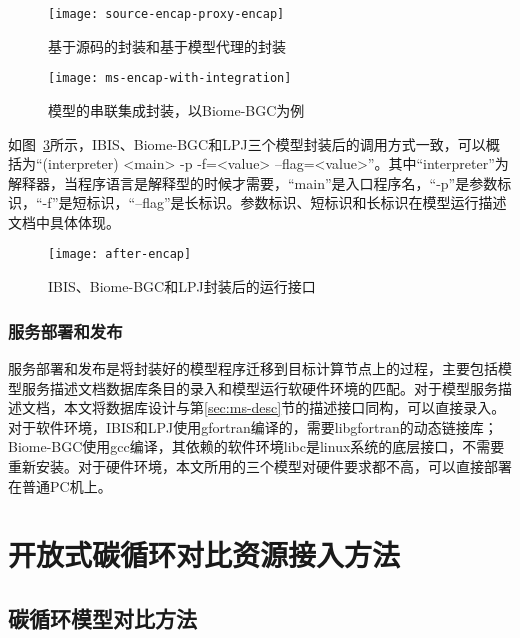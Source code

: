 \begin{figure}[!htbp]
    \centering
    \texttt{[image: source-encap-proxy-encap]}
    \caption{基于源码的封装和基于模型代理的封装}
    \label{fig:source-encap-proxy-encap}
\end{figure}

\begin{figure}[!htbp]
    \centering
    \texttt{[image: ms-encap-with-integration]}
    \caption{模型的串联集成封装，以Biome-BGC为例}
    \label{fig:ms-encap-with-integration}
\end{figure}

如图~\ref{fig:after-encap}所示，IBIS、Biome-BGC和LPJ三个模型封装后的调用方式一致，可以概括为``(interpreter) <main> -p -f=<value> --flag=<value>''。其中``interpreter''为解释器，当程序语言是解释型的时候才需要，“main”是入口程序名，“-p”是参数标识，“-f”是短标识，“--flag”是长标识。参数标识、短标识和长标识在模型运行描述文档中具体体现。

\begin{figure}[!htbp]
    \centering
    \texttt{[image: after-encap]}
    \caption{IBIS、Biome-BGC和LPJ封装后的运行接口}
    \label{fig:after-encap}
\end{figure}


\subsubsection{服务部署和发布}
服务部署和发布是将封装好的模型程序迁移到目标计算节点上的过程，主要包括模型服务描述文档数据库条目的录入和模型运行软硬件环境的匹配。对于模型服务描述文档，本文将数据库设计与第\ref{sec:ms-desc}节的描述接口同构，可以直接录入。对于软件环境，IBIS和LPJ使用gfortran编译的，需要libgfortran的动态链接库；Biome-BGC使用gcc编译，其依赖的软件环境libc是linux系统的底层接口，不需要重新安装。对于硬件环境，本文所用的三个模型对硬件要求都不高，可以直接部署在普通PC机上。

\section{开放式碳循环对比资源接入方法}
\subsection{碳循环模型对比方法}
